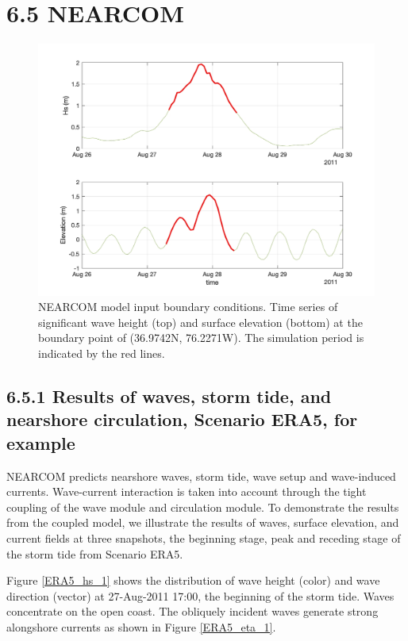 \documentclass[11pt]{article}
\begin{document}
\section*{6.5 NEARCOM} 

\begin{figure}[h!]
\centering
\includegraphics[width=\textwidth]{./figures/nearcom_wave_flow.jpg}
\caption{NEARCOM model input boundary conditions. Time series of significant wave height (top) and surface elevation (bottom) at the boundary point of (36.9742N, 76.2271W). The simulation period is indicated by the red lines. }
\label{ERA5_time}
\centering
\end{figure}

\subsection*{6.5.1 Results of waves, storm tide, and nearshore circulation, Scenario ERA5, for example}

NEARCOM predicts nearshore waves, storm tide, wave setup and wave-induced currents. Wave-current interaction is taken into account through the tight coupling of the wave module and circulation module.  To demonstrate the results from the coupled model, we illustrate the results of waves, surface elevation, and current fields at three snapshots, the beginning stage, peak and receding stage of the storm tide from Scenario ERA5. 

Figure \ref{ERA5_hs_1} shows the distribution of wave height (color) and wave direction (vector) at 27-Aug-2011 17:00, the beginning of the storm tide. Waves concentrate on the open coast. The obliquely incident waves generate strong alongshore currents as shown in Figure \ref{ERA5_eta_1}.
\end{document}
